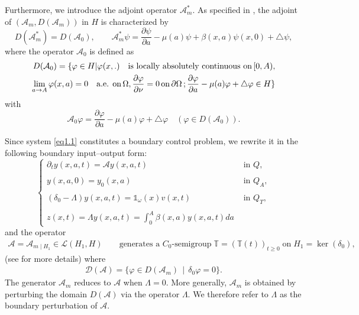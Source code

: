 \documentclass[10pt, a4]{amsart}
\theoremstyle{plain}
\theoremstyle{definition}
\theoremstyle{remark}
\numberwithin{equation}{section}
\begin{document}
Furthermore, we introduce the adjoint operator \(\mathcal{A}_m^*\). As specified in \cite{ref3}, the adjoint of \((\mathcal{A}_m, D(\mathcal{A}_m))\) in \(H\) is characterized by
\[
D(\mathcal{A}_m^*) = D(\mathcal{A}_0), \qquad \mathcal{A}_m^* \psi = \frac{\partial \psi}{\partial a} - \mu(a)\psi + \beta(x,a)\psi(x,0) + \triangle \psi,
\]
where the operator \(\mathcal{A}_0\) is defined as
\begin{align*}
 D(\mathcal{A}_0)=\{\varphi\in H|\varphi(x,.)\quad\hbox{is locally absolutely continuous on}\,[0,A),\\
 \lim_{a\rightarrow A}\varphi(x,a)=0 \quad\hbox{a.e. on}\, \Omega,\dfrac{\partial\varphi}{\partial\nu}=0 \,\text{on}\,\partial\Omega\,; \dfrac{\partial \varphi}{\partial a}-\mu(a)\varphi+\triangle\varphi\in H\}
\end{align*} 
with
\[
\mathcal{A}_0 \varphi = \frac{\partial \varphi}{\partial a} - \mu(a)\varphi + \triangle \varphi \quad (\varphi \in D(\mathcal{A}_0)).
\]

Since system \eqref{eq1.1} constitutes a boundary control problem,  we rewrite it in the following boundary input–output form:
\begin{equation}\label{e2.1}
\left\lbrace 
\begin{array}{ll}
\partial_{t}y(x,a,t)=\mathcal{A} y(x,a,t) & \text{ in }  Q,\\
\\y(x,a,0)=y_{0}(x,a)&\text{ in } Q_A,\\
\\(\delta_0-\Lambda) y(x,a,t)=\mathds{1}_{\omega}(x)v(x,t) &\text{ in }  Q_{T},\\
\\z(x,t)=\Lambda y(x,a,t)=\displaystyle\int_0^A\beta(x,a)y(x,a,t)da
\end{array}
\right.
\end{equation}
and  the operator 
\begin{align*}
    \mathcal{A} = \mathcal{A}_{m \mid H_1} \in \mathcal{L}(H_1, H)\qquad\text{generates a $C_0$-semigroup}\; \mathbb{T}=\left(\mathbb{T}(t)\right)_{t\geq 0}\; \text{on}\; H_1= \ker (\delta_0),
\end{align*}
(see \cite{ref78} for more details)  where
\begin{align*}
\mathcal{D}(\mathcal{A}) = \Big\{ \varphi \in D(\mathcal{A}_m) \, \mid \, \delta_0\varphi = 0 \Big\}.
\end{align*} 
The generator \(\mathcal{A}_m\) reduces to \(\mathcal{A}\) when \(\Lambda= 0\). More generally, \(\mathcal{A}_m\) is obtained by perturbing the domain \(D(\mathcal{A})\) via the operator \(\Lambda\). We therefore refer to \(\Lambda\) as the boundary perturbation of \(\mathcal{A}\).
  
\end{document}
